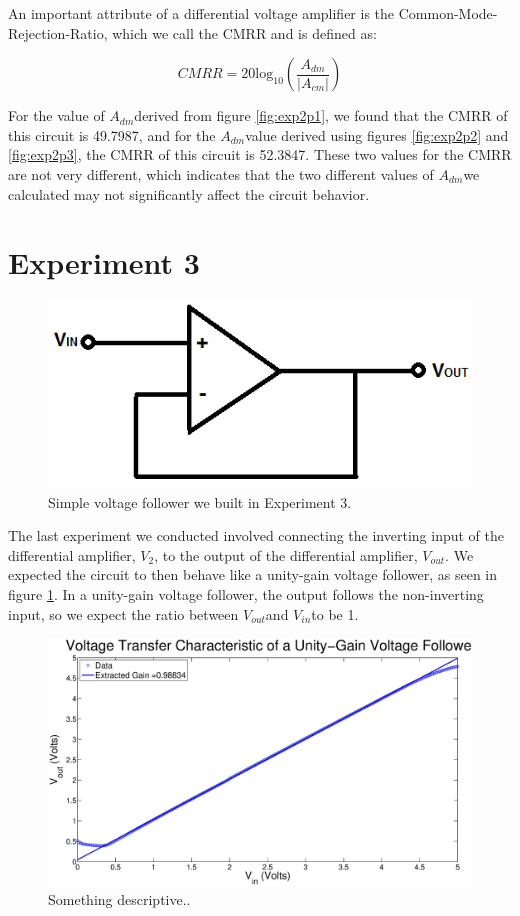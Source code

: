 \documentclass{article}
\newcommand{\Vout}{{$V_{out}$}}
\newcommand{\Vtwo}{{$V_{2}$}}
\newcommand{\Vin}{{$V_{in}$}}
\newcommand{\Adm}{{$A_{dm}$}}
\begin{document}
An important attribute of a differential voltage amplifier is the Common-Mode-Rejection-Ratio, which we call the CMRR and is defined as:

\begin{equation}
CMRR = 20\textrm{log}_{10}(\frac{A_{dm}}{|A_{cm}|})
\end{equation}

For the value of \Adm derived from figure \ref{fig:exp2p1}, we found that the CMRR of this circuit is 49.7987, and for the \Adm value derived using figures \ref{fig:exp2p2} and \ref{fig:exp2p3}, the CMRR of this circuit is 52.3847. These two values for the CMRR are not very different, which indicates that the two different values of \Adm we calculated may not significantly affect the circuit behavior.

\section*{Experiment 3} 

\begin{figure}[H]
\centering
\includegraphics[width=0.5\linewidth]{../Figures/Voltage-follower}
\caption{Simple voltage follower we built in Experiment 3.}
\label{fig:voltagefollow}
\end{figure}

The last experiment we conducted involved connecting the inverting input of the differential amplifier, \Vtwo, to the output of the differential amplifier, \Vout. We expected the circuit to then behave like a unity-gain voltage follower, as seen in figure \ref{fig:voltagefollow}. In a unity-gain voltage follower, the output follows the non-inverting input, so we expect the ratio between \Vout and \Vin to be 1.

\begin{figure}[H]
\centering
\includegraphics[width=\linewidth]{../Figures/Exp3P1.eps}
\caption{Something descriptive..}
\label{fig:exp3p1}
\end{figure}
\end{document}
